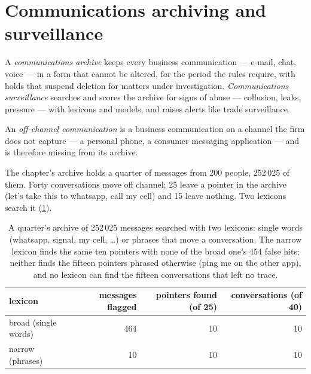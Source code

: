 \section{Communications archiving and surveillance}

\begin{definition}\label{def:pl:surveillance-and-compliance-technology:archive}
A \emph{communications archive} keeps every business communication --- e-mail, chat, voice --- in a form that
cannot be altered, for the period the rules require, with holds that suspend deletion for matters under investigation.
\emph{Communications surveillance} searches and scores the archive for signs of abuse --- collusion,
leaks, pressure --- with lexicons and models, and raises alerts like trade surveillance.
\end{definition}

\begin{definition}\label{def:pl:surveillance-and-compliance-technology:offchannel}
An \emph{off-channel communication} is a business communication on a channel the firm does not capture ---
a personal phone, a consumer messaging application --- and is therefore missing from its archive.
\end{definition}

The chapter's archive holds a quarter of messages from 200 people, 252\,025 of them. Forty conversations move off channel; 25 leave a pointer
in the archive (\textquotedbl{}let's take this to whatsapp\textquotedbl{}, \textquotedbl{}call my cell\textquotedbl{}) and 15 leave nothing.
Two lexicons search it (\cref{tab:pl:surveillance-and-compliance-technology:comms}).

\begin{table}[htbp]
\centering\small
\begin{tabular}{lrrr}
\toprule
lexicon & messages flagged & pointers found (of 25) & conversations (of 40)\\
\midrule
broad (single words) & 464 & 10 & 10\\
narrow (phrases) & 10 & 10 & 10\\
\bottomrule
\end{tabular}
\caption{A quarter's archive of 252\,025 messages searched with two lexicons: single words (whatsapp, signal, my cell, \dots) or phrases that move a conversation. The narrow lexicon finds the same ten pointers with none of the
broad one's 454 false hits; neither finds the fifteen pointers phrased otherwise (\textquotedbl{}ping me on the other app\textquotedbl{}), and
no lexicon can find the fifteen conversations that left no trace.}\label{tab:pl:surveillance-and-compliance-technology:comms}
\end{table}

